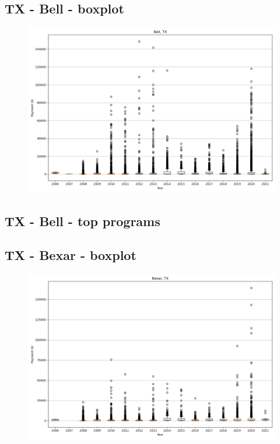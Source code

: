 \subsection*{TX - Bell - boxplot}
\begin{figure}[h]
\centering
\includegraphics[width=7in]{../output/boxplots/counties/Bell-TX_boxplot.png}
\end{figure}


\subsection*{TX - Bell - top programs}

\newpage
\subsection*{TX - Bexar - boxplot}
\begin{figure}[h]
\centering
\includegraphics[width=7in]{../output/boxplots/counties/Bexar-TX_boxplot.png}
\end{figure}


